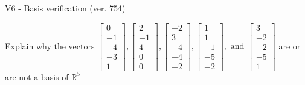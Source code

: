 \begin{exercise}
  \begin{exerciseTitle}V6 - Basis verification (ver. 754)\end{exerciseTitle}
  \begin{exerciseStatement}
    Explain why the vectors \(\left[\begin{array}{r}
0 \\
-1 \\
-4 \\
-3 \\
1
\end{array}\right] , \left[\begin{array}{r}
2 \\
-1 \\
4 \\
0 \\
0
\end{array}\right] , \left[\begin{array}{r}
-2 \\
3 \\
-4 \\
-4 \\
-2
\end{array}\right] , \left[\begin{array}{r}
1 \\
1 \\
-1 \\
-5 \\
-2
\end{array}\right] , \text{ and } \left[\begin{array}{r}
3 \\
-2 \\
-2 \\
-5 \\
1
\end{array}\right]\) are or are not a basis of \(\mathbb{R}^5\)	



\end{exerciseStatement}
\end{exercise}
